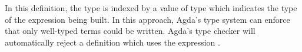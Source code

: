 \documentclass[sigconf]{acmart}
\begin{document}
\begin{code}%
%
\>[2]\AgdaSpace{}%
\AgdaSpace{}%
\AgdaSymbol{:}\AgdaSpace{}%
\AgdaSpace{}%
\<%
\\
\>[2][@{}l@{\AgdaIndent{0}}]%
\>[4]\AgdaSpace{}%
\AgdaSpace{}%
\AgdaSymbol{:}\AgdaSpace{}%
\<%
\\
%
\\[\AgdaEmptyExtraSkip]%
%
\>[2]\AgdaSpace{}%
\AgdaSpace{}%
\AgdaSymbol{:}\AgdaSpace{}%
\AgdaSpace{}%
\AgdaSpace{}%
\AgdaSpace{}%
\<%
\\
\>[2][@{}l@{\AgdaIndent{0}}]%
\>[4]\AgdaSpace{}%
\AgdaSpace{}%
\AgdaSymbol{:}\AgdaSpace{}%
\AgdaSpace{}%
\<%
\\
%
\>[4]\AgdaSpace{}%
\AgdaSymbol{:}\AgdaSpace{}%
\AgdaSpace{}%
\AgdaSpace{}%
\AgdaSpace{}%
\<%
\\
%
\>[4]\AgdaSpace{}%
\AgdaSymbol{:}\AgdaSpace{}%
\AgdaSpace{}%
\AgdaSpace{}%
\AgdaSpace{}%
\AgdaSpace{}%
\AgdaSpace{}%
\AgdaSpace{}%
\AgdaSpace{}%
\<%
\\
%
\>[4]\AgdaOperator{\AgdaInductiveConstructor{\AgdaUnderscore{}+\AgdaUnderscore{}}}\AgdaSpace{}%
\AgdaSymbol{:}\AgdaSpace{}%
\AgdaSpace{}%
\AgdaSpace{}%
\AgdaSpace{}%
\AgdaSpace{}%
\AgdaSpace{}%
\AgdaSpace{}%
\AgdaSpace{}%
\<%
\end{code}

In this definition, the  type is indexed by a value of type  which
indicates the type of the expression being built. In this approach, Agda's
type system can enforce that only well-typed terms could be written.
Agda's type checker will automatically reject a definition which uses the expression
.
\end{document}
